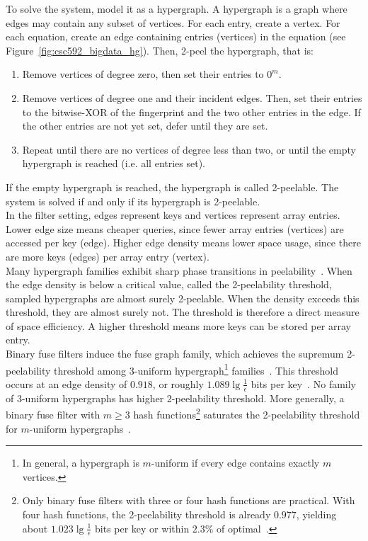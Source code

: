 

\noindent
To solve the system, model it as a hypergraph. A hypergraph is a graph where edges may contain any subset of vertices. For each entry, create a vertex. For each 
equation, create an edge containing entries (vertices) in the equation (see Figure~\ref{fig:csc592_bigdata_hg}). Then, 2-peel the hypergraph, that is:
\begin{enumerate}
    \item Remove vertices of degree zero, then set their entries to $0^m$.
    \item Remove vertices of degree one and their incident edges. Then, set their entries to the bitwise-XOR of the fingerprint and the two other entries in the
    edge. If the other entries are not yet set, defer until they are set.
    \item Repeat until there are no vertices of degree less than two, or until the empty hypergraph is reached (i.e. all entries set).
\end{enumerate}
If the empty hypergraph is reached, the hypergraph is called 2-peelable. The system is solved if and only if its hypergraph is 2-peelable. \\



\noindent
In the filter setting, edges represent keys and vertices represent array entries. Lower edge size means cheaper queries, since fewer array entries (vertices) 
are accessed per key (edge). Higher edge density means lower space usage, since there are more keys (edges) per array entry (vertex). \\

\noindent
Many hypergraph families exhibit sharp phase transitions in peelability~\cite{dietzfelbinger2019, walzer2021}. When the edge density is below a critical value, 
called the 2-peelability threshold, sampled hypergraphs are almost surely 2-peelable. When the density exceeds this threshold, they are almost surely not. The 
threshold is therefore a direct measure of space efficiency. A higher threshold means more keys can be stored per array entry. \\

\noindent
Binary fuse filters induce the fuse graph family, which achieves the supremum 2-peelability threshold among 3-uniform hypergraph\footnote{In general, a 
hypergraph is $m$-uniform if every edge contains exactly $m$ vertices.} families~\cite{walzer2021}. This threshold occurs at an edge density of $0.918$, or 
roughly $1.089 \lg \frac{1}{\epsilon}$ bits per key~\cite{walzer2021}. No family of 3-uniform hypergraphs has higher 2-peelability threshold. More generally, a 
binary fuse filter with $m \geq 3$ hash functions\footnote{Only binary fuse filters with three or four hash functions are practical. With four hash functions, 
the 2-peelability threshold is already $0.977$, yielding about $1.023 \lg \frac{1}{\epsilon}$ bits per key or within $2.3\%$ of optimal~\cite{walzer2021}.} 
saturates the 2-peelability threshold for $m$-uniform hypergraphs~\cite{walzer2021}. \\

